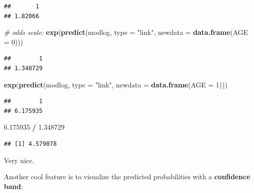 \documentclass[
]{article}
\newenvironment{Shaded}{\begin{snugshade}}{\end{snugshade}}
\newcommand{\AttributeTok}[1]{\textcolor[rgb]{0.13,0.29,0.53}{#1}}
\newcommand{\CommentTok}[1]{\textcolor[rgb]{0.56,0.35,0.01}{\textit{#1}}}
\newcommand{\DecValTok}[1]{\textcolor[rgb]{0.00,0.00,0.81}{#1}}
\newcommand{\FloatTok}[1]{\textcolor[rgb]{0.00,0.00,0.81}{#1}}
\newcommand{\FunctionTok}[1]{\textcolor[rgb]{0.13,0.29,0.53}{\textbf{#1}}}
\newcommand{\NormalTok}[1]{#1}
\newcommand{\SpecialCharTok}[1]{\textcolor[rgb]{0.81,0.36,0.00}{\textbf{#1}}}
\newcommand{\StringTok}[1]{\textcolor[rgb]{0.31,0.60,0.02}{#1}}
\begin{document}
\begin{verbatim}
##       1 
## 1.82066
\end{verbatim}

\begin{Shaded}
\begin{Highlighting}[]
\CommentTok{\# odds scale:}
\FunctionTok{exp}\NormalTok{(}\FunctionTok{predict}\NormalTok{(modlog, }\AttributeTok{type =} \StringTok{"link"}\NormalTok{,}
            \AttributeTok{newdata =} \FunctionTok{data.frame}\NormalTok{(}\AttributeTok{AGE =} \DecValTok{0}\NormalTok{)))}
\end{Highlighting}
\end{Shaded}

\begin{verbatim}
##        1 
## 1.348729
\end{verbatim}

\begin{Shaded}
\begin{Highlighting}[]
\FunctionTok{exp}\NormalTok{(}\FunctionTok{predict}\NormalTok{(modlog, }\AttributeTok{type =} \StringTok{"link"}\NormalTok{,}
            \AttributeTok{newdata =} \FunctionTok{data.frame}\NormalTok{(}\AttributeTok{AGE =} \DecValTok{1}\NormalTok{)))}
\end{Highlighting}
\end{Shaded}

\begin{verbatim}
##        1 
## 6.175935
\end{verbatim}

\begin{Shaded}
\begin{Highlighting}[]
\FloatTok{6.175935} \SpecialCharTok{/} \FloatTok{1.348729}
\end{Highlighting}
\end{Shaded}

\begin{verbatim}
## [1] 4.579078
\end{verbatim}

Very nice.

Another cool feature is to visualize the predicted probabilities with a
\textbf{confidence band}:
\end{document}
